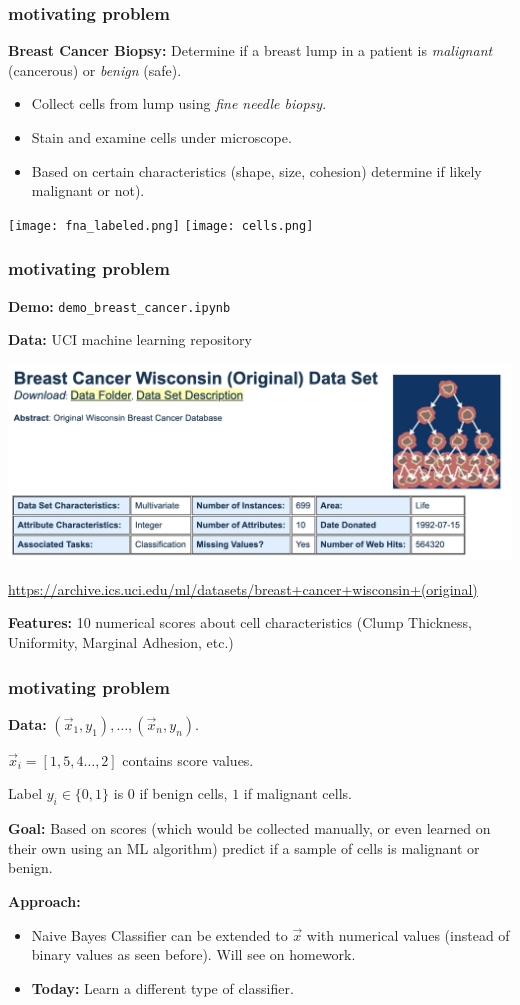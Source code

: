 \documentclass[handout,compress]{beamer}
\begin{document}
\begin{frame}
	\frametitle{motivating problem}
	\textbf{Breast Cancer Biopsy:} Determine if a breast lump in a patient is \emph{malignant} (cancerous) or \emph{benign} (safe). 
	\begin{itemize}
		\item Collect cells from lump using \emph{fine needle biopsy}.
		\item Stain and examine cells under microscope.
		\item Based on certain characteristics (shape, size, cohesion) determine if likely malignant or not).
	\end{itemize}
\begin{center}
	\texttt{[image: fna\_labeled.png]} \texttt{[image: cells.png]}
\end{center}
\end{frame}

\begin{frame}
	\frametitle{motivating problem}
	\textbf{Demo:} \texttt{demo\_breast\_cancer.ipynb}
	
	\textbf{Data:} UCI machine learning repository
	\begin{center}
		\includegraphics[width=.9\textwidth]{uci_cancer.png}
		
		\footnotesize{\url{https://archive.ics.uci.edu/ml/datasets/breast+cancer+wisconsin+(original)}}
	\end{center}

	\textbf{Features:} 10 numerical scores about cell characteristics (Clump Thickness, Uniformity, Marginal Adhesion, etc.)
	
\end{frame}

\begin{frame}
	\frametitle{motivating problem}
	\textbf{Data:} $(\vec{x}_1, y_1), \ldots, (\vec{x}_n, y_n)$. 
	
	$\vec{x}_i = [1,5,4\ldots, 2]$ contains score values. 
	
	Label $y_i\in \{0,1\}$ is $0$ if benign cells, $1$ if malignant cells.
	
	\textbf{Goal:} Based on scores (which would be collected manually, or even learned on their own using an ML algorithm) predict if a sample of cells is malignant or benign. 
	
	\textbf{Approach:}
	\begin{itemize}
		\item Naive Bayes Classifier can be extended to $\vec{x}$ with numerical values (instead of binary values as seen before).  Will see on homework.
		\item \textbf{Today:} Learn a different type of classifier.
	\end{itemize}
\end{frame}
\end{document}
